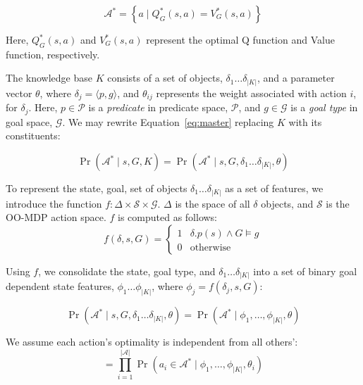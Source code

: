 \documentclass[conference]{IEEEtran}
\begin{document}
\begin{equation}
\mathcal{A}^* = \left\{ a \mid Q^*_G(s,a) = V^*_G(s,a) \right\}
\label{eq:opt_act_set}
\end{equation}

Here, $Q^*_G(s,a)$ and $V^*_G(s,a)$ represent the optimal Q function and 
Value function, respectively.

The knowledge base $K$ consists of a set of objects, $\delta_1 \ldots \delta_{|K|}$, and a 
parameter vector $\theta$, where $\delta_j = \langle p, g \rangle$, and $\theta_{ij}$
represents the weight associated with action $i$, for $\delta_j$. Here, $p \in \mathcal{P}$
is a {\it predicate} in predicate space, $\mathcal{P}$, and $g \in \mathcal{G}$ is a {\it goal type}
in goal space, $\mathcal{G}$. We may rewrite Equation~\ref{eq:master} replacing $K$ with
its constituents:

\begin{equation}
\Pr(\mathcal{A}^* \mid s, G, K) = \Pr(\mathcal{A}^* \mid s, G, \delta_1 \ldots \delta_{|K|}, \theta)
\end{equation}

To represent the state, goal, set of objects $\delta_1 \ldots \delta_{|K|}$ as a set of features,
we introduce the function $f : \Delta \times \mathcal{S} \times \mathcal{G}$.
$\Delta$ is the space of all $\delta$ objects, and $\mathcal{S}$
is the OO-MDP action space. $f$ is computed as follows:
\begin{equation}
f(\delta, s, G) = 
\begin{cases}
1& \delta.p(s) \wedge G \models g \\
0& \text{otherwise}
\end{cases}
\label{eq:f_func_def}
\end{equation}

Using $f$, we consolidate the state, goal type, and $\delta_1 \ldots \delta_{|K|}$ into a set of binary goal dependent
state features, $\phi_1 \ldots \phi_{|K|}$, where $\phi_j = f(\delta_j, s, G)$:

\begin{equation}
\Pr(\mathcal{A}^* \mid s, G, \delta_1 \ldots \delta_{|K|}, \theta) = \Pr(\mathcal{A}^* \mid \phi_1, \ldots, \phi_{|K|}, \theta)
\label{eq:feature_rep}
\end{equation}

We assume each action's optimality is independent from all others':
\begin{equation}
= \prod_{i=1}^{|\mathcal{A}|} \Pr(a_i \in \mathcal{A}^* \mid \phi_1, \ldots, \phi_{|K|}, \theta_i)
\label{eq:action_independ}
\end{equation}
\end{document}
